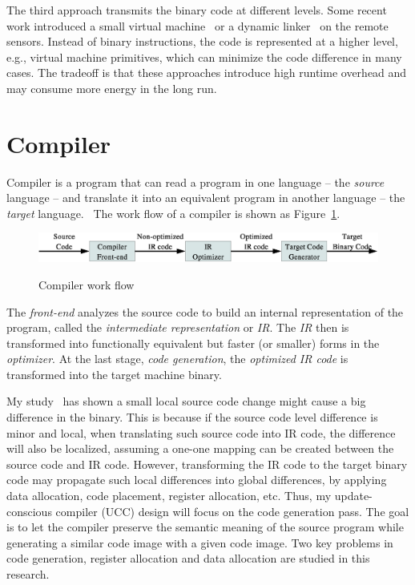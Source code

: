 The third approach transmits the binary code at different levels.  Some recent work introduced a small virtual 
machine~\cite{mate} or a dynamic linker~\cite{related:dynamic2,related:dynamic1} on the remote sensors. Instead of 
binary instructions, the code is represented at a higher level, e.g., virtual machine primitives,
which can minimize the code difference in many cases. The tradeoff is that these approaches introduce high runtime 
overhead and may consume more energy in the long run.


\section{Compiler}

Compiler is a program that can read a program in one language -- the \textit{source} language -- and translate it into 
an equivalent program in another language -- the \textit{target} language.~\cite{compiler}
The work flow of a compiler is shown as Figure~\ref{fig:compiler}.

\begin{figure}[htbp]
	\centering
		\includegraphics[scale=0.45]{figures/compiler.eps}
	\label{fig:compiler}
	\caption{Compiler work flow}
\end{figure}

The \textit{front-end} analyzes the source code to build an internal representation of the program, called the 
\textit{intermediate representation} or \textit{IR}. The \textit{IR} then is transformed into functionally equivalent 
but faster (or smaller) forms in the \textit{optimizer}. At the last stage, \textit{code generation}, the 
\textit{optimized IR code} is transformed into the target machine binary.

My study~\cite{ucc} has shown a small local source code change might cause a big difference in the binary. This is 
because if the source code level difference is minor and local, when translating such source code into IR code, the 
difference will also be localized, assuming a one-one mapping can be created between the source code and IR code. 
However, transforming the IR code to the target binary code may propagate such local differences into global 
differences, by applying data allocation, code placement, register allocation, etc. Thus, my update-conscious 
compiler (UCC) design will focus on the code generation pass. The goal is to let the compiler preserve the semantic 
meaning of the source program while generating a similar code image with a given code image. Two key problems in code 
generation, register allocation and data allocation are studied in this research.

